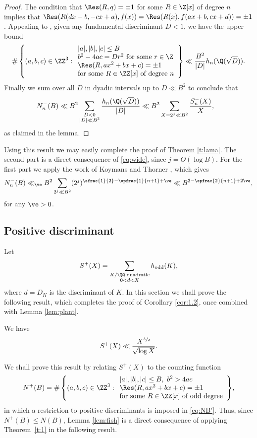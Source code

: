 \begin{proof}
The condition that $\Res(R,q)=\pm 1$ for some $R\in\Z[x]$ of degree $n$ implies that
$\Res(R(dx-b,-cx+a),f(x))=\Res(R(x),f(ax+b,cx+d))=\pm 1$.
Appealing to \cite[Th.\,1.1]{aaron}, given any fundamental discriminant $D<1$, we have the upper bound
\[
\#\left\{(a,b,c)\in \ZZ^3:
\begin{array}{l}
|a|,|b|,|c|\leq B\\
b^2-4ac=Dr^2\text{ for some }r\in\Z\\
\Res(R,ax^2+bx+c)=\pm 1\\
\text{for some $R\in \ZZ[x]$ of degree $n$}
\end{array}
\right\}
\ll \frac{B^{2}}{|D|}h_n(\Q(\sqrt{D})).
\]
Finally we sum over all $D$ in dyadic intervals up to $D\ll B^2$
to conclude that
\begin{align*}
N_n^-(B)
&\ll B^2 \sum_{\substack{D<0\\ |D|\ll B^2}} \frac{h_n(\Q(\sqrt{D}))}{|D|}
\ll B^2 \sum_{X=2^j \ll B^2} \frac{S_n^-(X)}{X},
\end{align*}
as claimed in the lemma.
\end{proof}

Using this result we may easily complete the proof of
Theorem \ref{t:lama}. The second part is a direct consequence of \eqref{eq:wide}, since
$j=O(\log B)$. For the first part we apply the work
of Koymans and Thorner
\cite{koy}, which gives
\[
N_n^-(B)\ll_\ve
B^2 \sum_{2^j \ll B^2}
(2^j)^{\sfrac{1}{2}-\spfrac{1}{n+1}+\ve}\ll B^{3-\spfrac{2}{n+1}+2\ve},
\]
for any $\ve>0$.

\subsection{Positive discriminant}\label{sec:disc2}

Let
\[
S^+(X)=
\sum_{
\substack{K/\QQ \text{ quadratic}\\
0<d<X
}} h_\text{odd}(K),
\]
where $d=D_K$ is the discriminant of $K$.
In this section we shall prove the following result, which completes the proof of Corollary \ref{cor:1.2}, once combined with Lemma \ref{lem:plant}.

\begin{lemma}\label{lem:fish}
We have
\[
S^+(X)\ll \frac{X^{\sfrac{3}{2}}}{\sqrt{\log X}}.
\]
\end{lemma}

We shall prove this result by relating $S^+(X)$ to the counting function
\[
N^+(B)=\#\left\{(a,b,c)\in \ZZ^3:
\begin{array}{l}
|a|,|b|,|c|\leq B, ~b^2>4ac\\
\Res(R,ax^2+bx+c)=\pm 1\\
\text{for some $R\in \ZZ[x]$ of odd degree}
\end{array}
\right\}\!,
\]
in which a restriction to positive discriminants is imposed in
\eqref{eq:NB'}. Thus, since $N^+(B)\leq N(B)$,
Lemma \ref{lem:fish} is a direct consequence of
applying Theorem~\ref{t:1} in
the following result.

